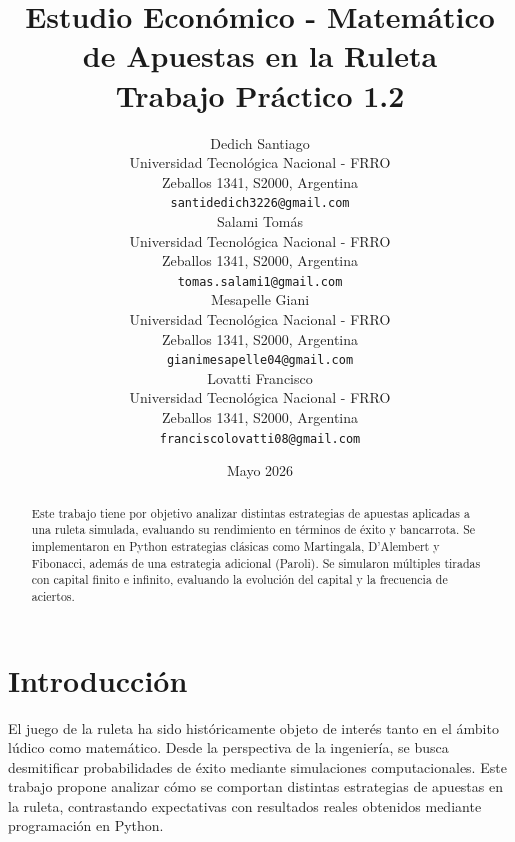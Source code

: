 \documentclass{article}
\title{\textbf{Estudio Económico - Matemático \\ de Apuestas 
en la Ruleta} \\ \large Trabajo Práctico 1.2}
\author{
 Dedich Santiago \\
  Universidad Tecnológica Nacional - FRRO\\
  Zeballos 1341, S2000, Argentina\\
  \texttt{santidedich3226@gmail.com} \\
   \And
 Salami Tomás \\
  Universidad Tecnológica Nacional - FRRO\\
  Zeballos 1341, S2000, Argentina\\
  \texttt{tomas.salami1@gmail.com} \\
  \And
Mesapelle Giani\\
  Universidad Tecnológica Nacional - FRRO\\
  Zeballos 1341, S2000, Argentina\\
  \texttt{gianimesapelle04@gmail.com}\\
  \And
Lovatti Francisco\\
  Universidad Tecnológica Nacional - FRRO\\
  Zeballos 1341, S2000, Argentina\\
  \texttt{franciscolovatti08@gmail.com}\\
}
\date{Mayo 2026}
\begin{document}
\maketitle

\begin{abstract}
Este trabajo tiene por objetivo analizar distintas estrategias de apuestas aplicadas a una ruleta simulada, evaluando su rendimiento en términos de éxito y bancarrota. Se implementaron en Python estrategias clásicas como Martingala, D’Alembert y Fibonacci, además de una estrategia adicional (Paroli). Se simularon múltiples tiradas con capital finito e infinito, evaluando la evolución del capital y la frecuencia de aciertos.
\end{abstract}

\section{Introducción}
El juego de la ruleta ha sido históricamente objeto de interés tanto en el ámbito lúdico como matemático. Desde la perspectiva de la ingeniería, se busca desmitificar probabilidades de éxito mediante simulaciones computacionales. Este trabajo propone analizar cómo se comportan distintas estrategias de apuestas en la ruleta, contrastando expectativas con resultados reales obtenidos mediante programación en Python.
\end{document}
